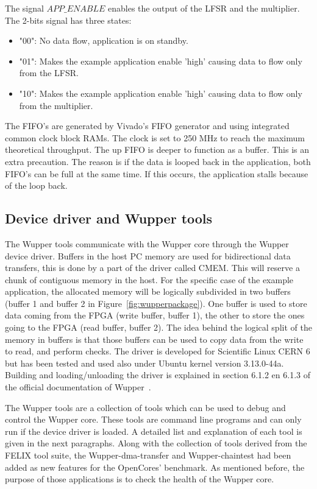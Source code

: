 The signal $APP\_ENABLE$ enables the output of the LFSR and the multiplier. The 2-bits signal has three states:
\begin{itemize}
	\item "00": No data flow, application is on standby.
	\item "01": Makes the example application enable 'high' causing data to flow only from the LFSR.
	\item "10": Makes the example application enable 'high' causing data to flow only from the multiplier.
\end{itemize}
The FIFO's are generated by Vivado's FIFO generator and using integrated common clock block RAMs. The clock is set to 250 MHz to reach the maximum theoretical throughput. The up FIFO is deeper to function as a buffer. This is an extra precaution. The reason is if the data is looped back in the application, both FIFO's can be full at the same time. If this occurs, the application stalls because of the loop back.

\newpage


\subsection{Device driver and Wupper tools}


The Wupper tools communicate with the Wupper core through the Wupper device driver. Buffers in the host PC memory are used for bidirectional data transfers, this is done by a part of the driver called CMEM. This will reserve a chunk of contiguous memory in the host. For the specific case of the example application, the allocated memory will be logically subdivided in two buffers (buffer 1 and buffer 2 in Figure~\ref{fig:wupperpackage}). One buffer is used to store data coming from the FPGA (write buffer, buffer 1), the other to store the ones going to the FPGA (read buffer, buffer 2). The idea behind the logical split of the memory in buffers is that those buffers can be used to copy data from the write to read, and perform checks. The driver is developed for Scientific Linux CERN 6 but has been tested and used also under Ubuntu kernel version 3.13.0-44a. Building and loading/unloading the driver is explained in section 6.1.2 en 6.1.3 of the official documentation of Wupper~\cite{operatingpcieengine}.

The Wupper tools are a collection of tools which can be used to debug and control the Wupper core. These tools are command line programs and can only run if the device driver is loaded. A detailed list and explanation of each tool is given in the next paragraphs. Along with the collection of tools derived from the FELIX tool suite, the Wupper-dma-transfer and Wupper-chaintest had been added as new features for the OpenCores' benchmark. As mentioned before, the purpose of those applications is to check the health of the Wupper core. 

